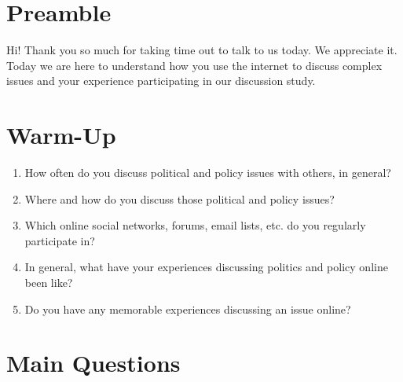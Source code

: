\section{Preamble}

Hi! Thank you so much for taking time out to talk to us today. We appreciate it. Today we are here to understand how you use the internet to discuss complex issues and your experience participating in our discussion study.

\section{Warm-Up}

\begin{enumerate}
\item How often do you discuss political and policy issues with others, in general?
\item Where and how do you discuss those political and policy issues?
\item Which online social networks, forums, email lists, etc. do you regularly participate in?
\item In general, what have your experiences discussing politics and policy online been like?
\item Do you have any memorable experiences discussing an issue online?
\end{enumerate}

\section{Main Questions}

